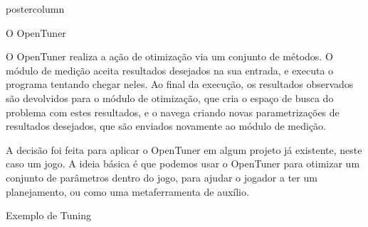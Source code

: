 \documentclass[final]{beamer}
\begin{document}
\begin{frame}
\begin{columns}
\begin{column}{.5\textwidth}
\begin{beamercolorbox}[center,wd=\textwidth]{postercolumn}
\begin{minipage}[T]{.95\textwidth}
{\begin{block}{O OpenTuner}
                \vspace*{0.2cm}
                
                O OpenTuner realiza a ação de otimização via um conjunto de métodos. O módulo de medição aceita resultados desejados na sua entrada, e executa o programa tentando chegar neles. Ao final da execução, os resultados observados são devolvidos para o módulo de otimização, que cria o espaço de busca do problema com estes resultados, e o navega criando novas parametrizações de resultados desejados, que são enviados novamente ao módulo de medição.
                
                \vspace*{0.4cm} 
                
                
                
                
                \vspace*{0.2cm} 
                
                A decisão foi feita para aplicar o OpenTuner em algum projeto já existente, neste caso um jogo. A ideia básica é que podemos usar o OpenTuner para otimizar um conjunto de parâmetros dentro do jogo, para ajudar o jogador a ter um planejamento, ou como uma metaferramenta de auxílio.
                               
                \vspace*{0.2cm} 
            \end{block}
                        
            \vspace*{0.2cm}
            
            \begin{block}{Exemplo de Tuning}
            	\center 
            	

\end{block}}
\end{minipage}
\end{beamercolorbox}
\end{column}
\end{columns}
\end{frame}
\end{document}
